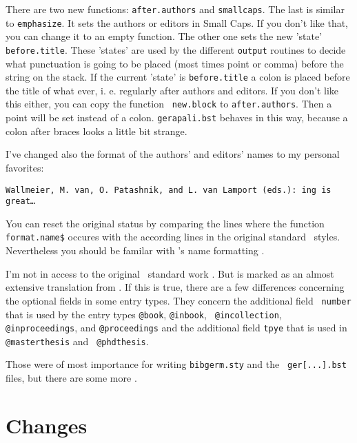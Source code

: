 There are two new functions: {\tt after.authors} and {\tt smallcaps}. The 
last is similar to {\tt emphasize}. It sets the authors or editors in {\sc 
Small Caps}. If you don't like that, you can change it to an empty 
function. The other one sets the new 'state' {\tt before.title}. These 
'states' are used by the different {\tt output} routines to decide what 
punctuation is going to be placed (most times point or comma) before the 
string on the stack. If the current 'state' is {\tt before.title} a colon 
is placed before the title of what ever, i.\,\,e. regularly after authors 
and editors. If you don't like this either, you can copy the function {\tt 
new.block} to {\tt after.authors}. Then a point will be set instead of a 
colon. {\tt gerapali.bst} behaves in this way, because a colon after braces 
looks a little bit strange.

I've changed also the format of the authors' and editors' names to my 
personal favorites:

\begin{center}\begin{minipage}{.7\textwidth}\raggedright\tt Wallmeier, M. 
van, O. Patashnik, and L. van Lamport (eds.): \bibtex ing is 
great\ldots\end{minipage}\end{center}

You can reset the original status by comparing the lines where the function 
{\tt format.name\$} occures with the according lines in the original 
standard \bibtex\ styles. Nevertheless you should be familar with \bibtex's 
name formatting \cite[section 5.4]{bibtex.b}.

I'm not in access to the original \latex\ standard work \cite{lamport}. But 
\cite[appendix B]{kopka} is marked as an almost extensive translation from 
\cite{lamport}. If this is true, there are a few differences concerning the 
optional fields in some entry types. They concern the additional field {\tt 
number} that is used by the entry types {\tt @book}, {\tt @inbook}, {\tt 
@incollection}, {\tt @inproceedings}, and {\tt @proceedings} and the 
additional field {\tt tpye} that is used in {\tt @masterthesis} and {\tt 
@phdthesis}.

Those were of most importance for writing {\tt bibgerm.sty} and the {\tt 
ger[...].bst} files, but there are some more \cite[section 2.2 'Changes to 
the standard styles']{bibtex.a}.


\section{Changes}

